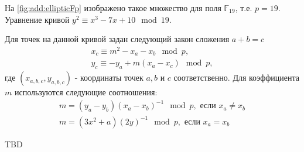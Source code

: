 

На \autoref{fig:add:ellipticFp} изображено такое множество для поля
$\mathbb{F}_{19}$, т.е. $p = 19$. Уравнение кривой $y^2 \equiv x^3 -7
x + 10 \mod 19$.

Для точек на данной кривой задан следующий закон сложения $a + b = c$
\begin{eqnarray}
x_{c} \equiv m^2 - x_a - x_b \mod p,
\nonumber \\
y_{c} \equiv - y_a + m \left(x_a - x_c\right) \mod p,
\label{eq:add:discretmath:elliptic:addfp}
\end{eqnarray}
где $(x_{a,b,c}, y_{a,b,c})$ - координаты точек $a,b$ и $c$
соответственно. Для коэффициента $m$ используются следующие
соотношения: 
\begin{eqnarray}
m = \left(y_a - y_b\right)\left(x_a - x_b\right)^{-1} \mod p, \mbox{ если } x_a \ne x_b
\nonumber \\
m = \left(3x^2 + a\right)\left(2y\right)^{-1} \mod p, \mbox{ если }
x_a = x_b
\nonumber
\end{eqnarray}


TBD
